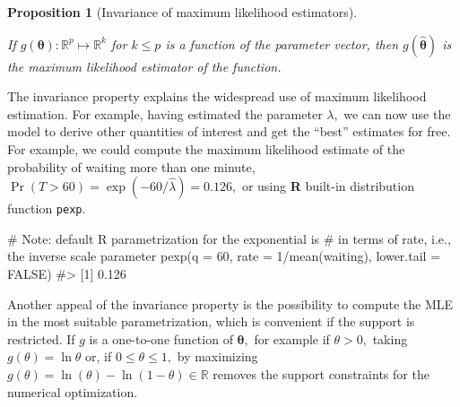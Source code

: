 \documentclass[
  11pt,
  letterpaper,
]{scrbook}
\newenvironment{Shaded}{\begin{snugshade}}{\end{snugshade}}
\newcommand{\AttributeTok}[1]{\textcolor[rgb]{0.40,0.45,0.13}{#1}}
\newcommand{\CommentTok}[1]{\textcolor[rgb]{0.37,0.37,0.37}{#1}}
\newcommand{\ConstantTok}[1]{\textcolor[rgb]{0.56,0.35,0.01}{#1}}
\newcommand{\DecValTok}[1]{\textcolor[rgb]{0.68,0.00,0.00}{#1}}
\newcommand{\FunctionTok}[1]{\textcolor[rgb]{0.28,0.35,0.67}{#1}}
\newcommand{\NormalTok}[1]{\textcolor[rgb]{0.00,0.23,0.31}{#1}}
\newcommand{\SpecialCharTok}[1]{\textcolor[rgb]{0.37,0.37,0.37}{#1}}
\theoremstyle{definition}
\theoremstyle{definition}
\theoremstyle{plain}
\newtheorem{proposition}{Proposition}[chapter]
\theoremstyle{remark}
\begin{document}
\begin{proposition}[Invariance of maximum likelihood
estimators]\protect\hypertarget{prp-invariance-mle}{}\label{prp-invariance-mle}

If \(g(\boldsymbol{\theta}): \mathbb{R}^p \mapsto \mathbb{R}^k\) for
\(k \leq p\) is a function of the parameter vector, then
\(g(\widehat{\boldsymbol{\theta}})\) is the maximum likelihood estimator
of the function.

\end{proposition}

The invariance property explains the widespread use of maximum
likelihood estimation. For example, having estimated the parameter
\(\lambda,\) we can now use the model to derive other quantities of
interest and get the ``best'' estimates for free. For example, we could
compute the maximum likelihood estimate of the probability of waiting
more than one minute,
\(\Pr(T>60) = \exp(-60/\widehat{\lambda})= 0.126,\) or using \textbf{R}
built-in distribution function \texttt{pexp}.

\begin{Shaded}
\begin{Highlighting}[]
\CommentTok{\# Note: default R parametrization for the exponential is }
\CommentTok{\# in terms of rate, i.e., the inverse scale parameter}
\FunctionTok{pexp}\NormalTok{(}\AttributeTok{q =} \DecValTok{60}\NormalTok{, }\AttributeTok{rate =} \DecValTok{1}\SpecialCharTok{/}\FunctionTok{mean}\NormalTok{(waiting), }\AttributeTok{lower.tail =} \ConstantTok{FALSE}\NormalTok{)}
\CommentTok{\#\textgreater{} [1] 0.126}
\end{Highlighting}
\end{Shaded}

Another appeal of the invariance property is the possibility to compute
the MLE in the most suitable parametrization, which is convenient if the
support is restricted. If \(g\) is a one-to-one function of
\(\boldsymbol{\theta},\) for example if \(\theta >0,\) taking
\(g(\theta) = \ln \theta\) or, if \(0 \leq \theta \leq 1,\) by
maximizing \(g(\theta) = \ln(\theta) - \ln(1-\theta) \in \mathbb{R}\)
removes the support constraints for the numerical optimization.
\end{document}
